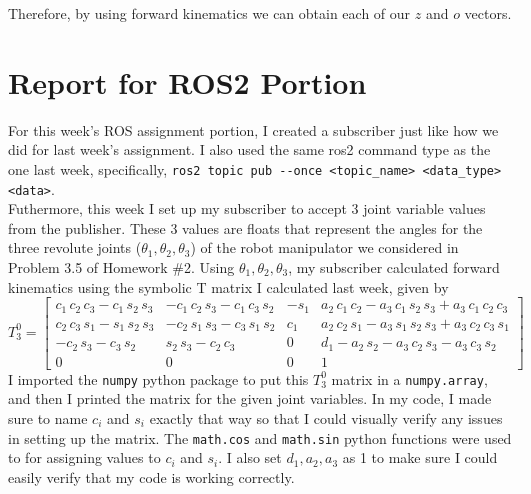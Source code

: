 \documentclass{article}
\begin{document}
Therefore, by using forward kinematics we can obtain each of our $z$ and $o$ vectors.

\nobreak{}\nobreak{}
\nobreak{}\nobreak{}

\pagebreak

\nobreak{}\nobreak{}

\section{Report for ROS2 Portion}

For this week's ROS assignment portion, I created a subscriber just like how
we did for last week's assignment. I also used the same ros2 command type as
the one last week, specifically,
\lstinline{ros2 topic pub --once <topic_name> <data_type> <data>}.
\vspace{0.17in}
\\Futhermore, this week I set up my subscriber to accept 3 joint variable 
values from the publisher. These 3 values are floats that represent the
angles for the three revolute joints (\(\theta_1, \theta_2, \theta_3\))
of the robot manipulator we considered in Problem 3.5 of Homework \#2. Using
\(\theta_1, \theta_2, \theta_3\), my subscriber calculated forward kinematics
using the symbolic T matrix I calculated last week, given by
\[
    T_3^0 =
    \begin{bmatrix}
        c_{1}\,c_{2}\,c_{3}-c_{1}\,s_{2}\,s_{3} & -c_{1}\,c_{2}\,s_{3}-c_{1}\,c_{3}\,s_{2} & -s_{1} & a_{2}\,c_{1}\,c_{2}-a_{3}\,c_{1}\,s_{2}\,s_{3}+a_{3}\,c_{1}\,c_{2}\,c_{3}\\
        c_{2}\,c_{3}\,s_{1}-s_{1}\,s_{2}\,s_{3} & -c_{2}\,s_{1}\,s_{3}-c_{3}\,s_{1}\,s_{2} & c_{1} & a_{2}\,c_{2}\,s_{1}-a_{3}\,s_{1}\,s_{2}\,s_{3}+a_{3}\,c_{2}\,c_{3}\,s_{1}\\
        -c_{2}\,s_{3}-c_{3}\,s_{2} & s_{2}\,s_{3}-c_{2}\,c_{3} & 0 & d_{1}-a_{2}\,s_{2}-a_{3}\,c_{2}\,s_{3}-a_{3}\,c_{3}\,s_{2}\\
        0 & 0 & 0 & 1
    \end{bmatrix}
\]
I imported the \lstinline{numpy} python package to put this $T_3^0$ matrix in a
\lstinline{numpy.array}, and then I printed the matrix for the given joint variables.
In my code, I made sure to name $c_i$ and $s_i$ exactly that way so that I could
visually verify any issues in setting up the matrix. The \lstinline{math.cos} and
\lstinline{math.sin} python functions were used to for assigning values to $c_i$
and $s_i$. I also set $d_1, a_2, a_3$ as 1 to make sure I could easily verify
that my code is working correctly.
\end{document}
